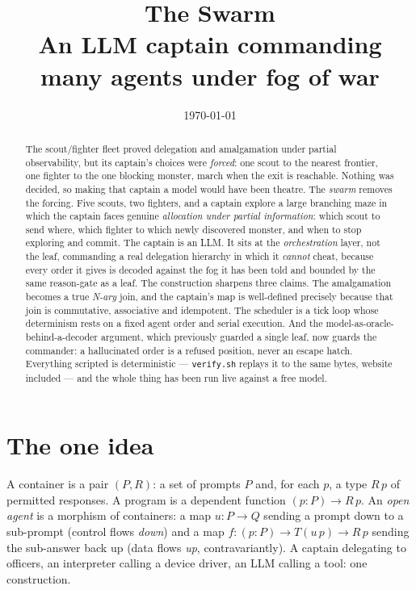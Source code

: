 \documentclass[11pt]{article}
\title{\textbf{The Swarm}\\[4pt]
  \large An LLM captain commanding many agents under fog of war}
\author{}
\date{\today}
\newcommand{\code}[1]{\texttt{#1}}
\begin{document}
\maketitle
\thispagestyle{empty}

\begin{abstract}
\noindent The scout/fighter fleet proved delegation and amalgamation under partial
observability, but its captain's choices were \emph{forced}: one scout to the nearest
frontier, one fighter to the one blocking monster, march when the exit is reachable.
Nothing was decided, so making that captain a model would have been theatre. The
\emph{swarm} removes the forcing. Five scouts, two fighters, and a captain explore a
large branching maze in which the captain faces genuine \emph{allocation under partial
information}: which scout to send where, which fighter to which newly discovered
monster, and when to stop exploring and commit. The captain is an LLM. It sits at the
\emph{orchestration} layer, not the leaf, commanding a real delegation hierarchy in
which it \emph{cannot} cheat, because every order it gives is decoded against the fog
it has been told and bounded by the same reason-gate as a leaf. The construction
sharpens three claims. The amalgamation becomes a true \emph{N-ary} join, and the
captain's map is well-defined precisely because that join is commutative, associative
and idempotent. The scheduler is a tick loop whose determinism rests on a fixed agent
order and serial execution. And the model-as-oracle-behind-a-decoder argument, which
previously guarded a single leaf, now guards the commander: a hallucinated order is a
refused position, never an escape hatch. Everything scripted is deterministic ---
\code{verify.sh} replays it to the same bytes, website included --- and the whole
thing has been run live against a free model.
\end{abstract}

\section{The one idea}

A container is a pair $(P, R)$: a set of prompts $P$ and, for each $p$, a type $R\,p$
of permitted responses. A program is a dependent function $(p : P) \to R\,p$. An
\emph{open agent} is a morphism of containers: a map $u : P \to Q$ sending a prompt
down to a sub-prompt (control flows \emph{down}) and a map $f : (p:P) \to T(u\,p) \to
R\,p$ sending the sub-answer back up (data flows \emph{up}, contravariantly). A
captain delegating to officers, an interpreter calling a device driver, an LLM calling
a tool: one construction.
\end{document}
